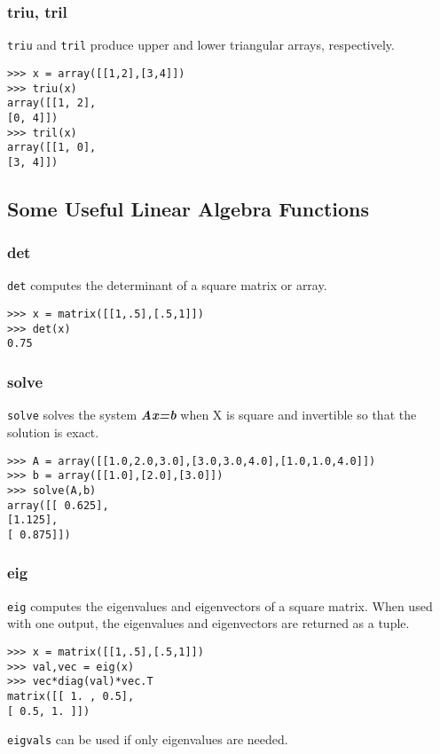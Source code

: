 \documentclass[KSmain.tex]{subfiles}
\begin{document}
\subsubsection{triu, tril}
\texttt{triu} and \texttt{tril} produce upper and lower triangular arrays, respectively.
\begin{framed}
\begin{verbatim}
>>> x = array([[1,2],[3,4]])
>>> triu(x)
array([[1, 2],
[0, 4]])
>>> tril(x)
array([[1, 0],
[3, 4]])

\end{verbatim}
\end{framed}

\newpage
\subsection{Some Useful Linear Algebra Functions}
\subsubsection{det}
\texttt{det} computes the determinant of a square matrix or array.
\begin{framed}
\begin{verbatim}
>>> x = matrix([[1,.5],[.5,1]])
>>> det(x)
0.75
\end{verbatim}
\end{framed}

\subsubsection{solve}

\texttt{solve} solves the system \textit{\textbf{Ax=b}} when X is square and invertible so that the solution is exact.
\begin{framed}
\begin{verbatim}
>>> A = array([[1.0,2.0,3.0],[3.0,3.0,4.0],[1.0,1.0,4.0]])
>>> b = array([[1.0],[2.0],[3.0]])
>>> solve(A,b)
array([[ 0.625],
[1.125],
[ 0.875]])
\end{verbatim}
\end{framed}

\subsubsection{eig}
\texttt{eig} computes the eigenvalues and eigenvectors of a square matrix. When used with one output, the eigenvalues
and eigenvectors are returned as a tuple.
\begin{framed}
\begin{verbatim}
>>> x = matrix([[1,.5],[.5,1]])
>>> val,vec = eig(x)
>>> vec*diag(val)*vec.T
matrix([[ 1. , 0.5],
[ 0.5, 1. ]])
\end{verbatim}
\end{framed}
\texttt{eigvals} can be used if only eigenvalues are needed.
\end{document}

